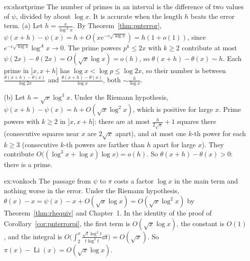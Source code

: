 \begin{solution}{ex:shortprime}
\idea The number of primes in an interval is the difference of two values of $\psi$, divided by about $\log x$. It is accurate when the length $h$ beats the error term.
\writeup (a) Let $h=\frac x{\log^Ax}$. By Theorem~\ref{thm:pnterror}, $\psi(x+h)-\psi(x)=h+O(xe^{-c\sqrt{\log x}})=h(1+o(1))$, since $e^{-c\sqrt{\log x}}\log^Ax\to0$. The prime powers $p^k\le2x$ with $k\ge2$ contribute at
most $\psi(2x)-\theta(2x)=O(\sqrt x\log x)=o(h)$, so $\theta(x+h)-\theta(x)\sim h$. Each prime in $]x,x+h]$ has $\log x<\log p\le\log2x$, so their number is between $\frac{\theta(x+h)-\theta(x)}{\log2x}$ and
$\frac{\theta(x+h)-\theta(x)}{\log x}$, both $\sim\frac h{\log x}$.

(b) Let $h=\sqrt x\log^3x$. Under the Riemann hypothesis, $\psi(x+h)-\psi(x)=h+O(\sqrt x\log^2x)$, which is positive for large $x$. Prime powers with $k\ge2$ in $]x,x+h]$: there are at most
$\frac h{2\sqrt x}+1$ squares there (consecutive squares near $x$ are $2\sqrt x$ apart), and at most one $k$-th power for each $k\ge3$ (consecutive $k$-th powers are farther than $h$ apart for large $x$).
They contribute $O\bigl((\log^3x+\log x)\log x\bigr)=o(h)$. So $\theta(x+h)-\theta(x)>0$: there is a prime.
\end{solution}

\begin{solution}{ex:vonkoch}
\idea The passage from $\psi$ to $\pi$ costs a factor $\log x$ in the main term and nothing worse in the error.
\writeup Under the Riemann hypothesis, $\theta(x)-x=\psi(x)-x+O(\sqrt x\log x)=O(\sqrt x\log^2x)$ by Theorem~\ref{thm:rhequiv} and Chapter~1. In the identity of the proof of Corollary~\ref{cor:pnterrorpi},
the first term is $O(\sqrt x\log x)$, the constant is $O(1)$, and the integral is $O\bigl(\int_2^x\frac{\sqrt t\log^2t}{t\log^2t}\dd t\bigr)=O(\sqrt x)$. So $\pi(x)-\operatorname{Li}(x)=O(\sqrt x\log x)$.
\end{solution}

